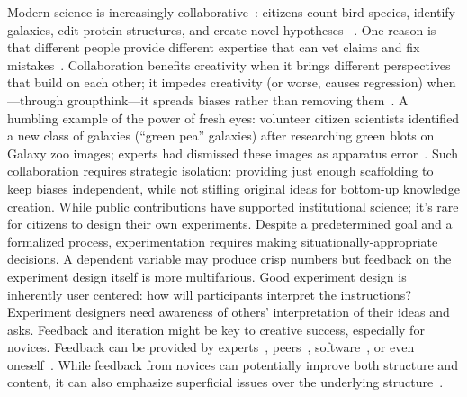 Modern science is increasingly collaborative~\cite{Nielsen2012}: citizens count bird species, identify galaxies, edit protein structures, and create novel hypotheses ~\cite{Cooper2012, Pandey2018,Zooniverse2007}. One reason is that different people provide different expertise that can vet claims and fix mistakes~\cite{kane2009s}. Collaboration benefits creativity when it brings different perspectives that build on each other; it impedes creativity (or worse, causes regression) when—through groupthink—it spreads biases rather than removing them~\cite{starbird2014rumors}. A humbling example of the power of fresh eyes: volunteer citizen scientists identified a new class of galaxies (“green pea” galaxies) after researching green blots on Galaxy zoo images; experts had dismissed these images as apparatus error~\cite{cardamone2009galaxy}. Such collaboration requires strategic isolation: providing just enough scaffolding to keep biases independent, while not stifling original ideas for bottom-up knowledge creation.
While public contributions have supported institutional science; it’s rare for citizens to design
their own experiments. Despite a predetermined goal and a formalized process, experimentation
requires making situationally-appropriate decisions. A dependent variable may produce crisp
numbers but feedback on the experiment design itself is more multifarious. Good experiment
design is inherently user centered: how will participants interpret the instructions? Experiment
designers need awareness of others’ interpretation of their ideas and asks. Feedback and iteration
might be key to creative success, especially for novices. Feedback can be provided by experts~\cite{dow2012shepherding, schon1984reflective}, peers~\cite{Boud1995, Kulkarni2015b}, software~\cite{Dantoni2015, Head2017}, or even oneself~\cite{Boud1995,schon1984reflective}. While feedback from novices can
potentially improve both structure and content, it can also emphasize superficial issues over the
underlying structure~\cite{chi1981expertise}.

